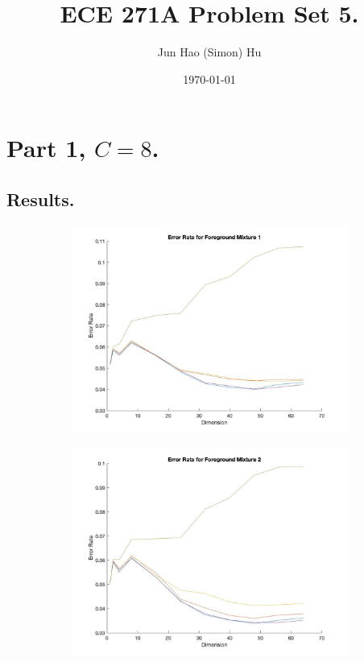 \documentclass[10pt]{article}
\title{\textbf{\large{ECE 271A Problem Set 5.}}}
\author{Jun Hao (Simon) Hu}
\date{\today}
\begin{document}
\maketitle

\section{Part 1, $C = 8$.}
\subsection{Results.}
\begin{figure}[H]
	\begin{subfigure}{0.5\textwidth}
		\centering 
		\includegraphics[scale=0.20]{part1_mix1.jpg}
		\caption{}
	\end{subfigure}
	\begin{subfigure}{0.5\textwidth}
		\centering 
		\includegraphics[scale=0.20]{part1_mix2.jpg}

\end{subfigure}
\end{figure}
\end{document}
